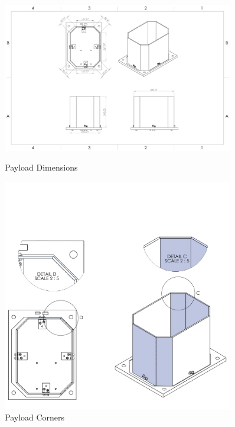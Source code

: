 \begin{figure}
    \centering
    \begin{minipage}{0.45\textwidth}
        \centering
        \includegraphics[width=0.9\textwidth]{figures/payload_dimensions.PDF} %
        \caption{Payload Dimensions}
        	\label{fig:payload_dim}
    \end{minipage}\hfill
    \begin{minipage}{0.45\textwidth}
        \centering
        \includegraphics[width=0.9\textwidth]{figures/payload_corners.PDF} %
        \caption{Payload Corners}
        	\label{fig:payload_corn}
    \end{minipage}
\end{figure}
%

